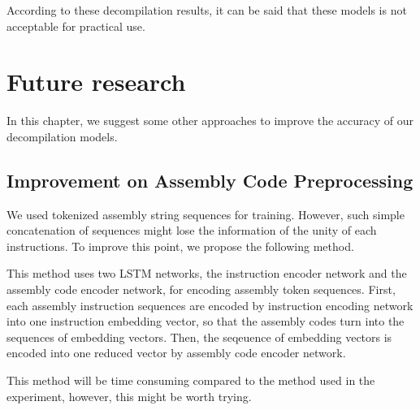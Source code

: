 \documentclass[senior,final,11pt]{iscs-thesis}
\begin{document}
According to these decompilation results, it can be said that these models is not acceptable for practical use.






\chapter{Future research}
In this chapter, we suggest some other approaches to improve the accuracy of our decompilation models.

\section{Improvement on Assembly Code Preprocessing}
We used tokenized assembly string sequences for training. 
However, such simple concatenation of sequences might lose the information of the unity of each instructions.
To improve this point, we propose the following method.

This method uses two LSTM networks, the instruction encoder network and the assembly code encoder network, for encoding assembly token sequences.
First, each assembly instruction sequences are encoded by instruction encoding network into one instruction embedding vector, 
so that the assembly codes turn into the sequences of embedding vectors.
Then, the seqeuence of embedding vectors is encoded into one reduced vector by assembly code encoder network.

This method will be time consuming compared to the method used in the experiment, however, this might be worth trying.
\end{document}
